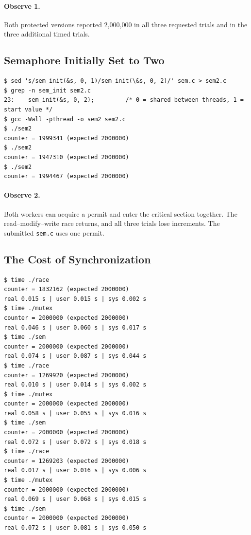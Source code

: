 \documentclass[12pt,a4paper]{article}
\begin{document}
\paragraph{Observe 1.} Both protected versions reported 2,000,000 in all three
requested trials and in the three additional timed trials.

\subsection{Semaphore Initially Set to Two}

\begin{lstlisting}[caption={Two permits admit both workers}]
$ sed 's/sem_init(&s, 0, 1)/sem_init(\&s, 0, 2)/' sem.c > sem2.c
$ grep -n sem_init sem2.c
23:    sem_init(&s, 0, 2);         /* 0 = shared between threads, 1 = start value */
$ gcc -Wall -pthread -o sem2 sem2.c
$ ./sem2
counter = 1999341 (expected 2000000)
$ ./sem2
counter = 1947310 (expected 2000000)
$ ./sem2
counter = 1994467 (expected 2000000)
\end{lstlisting}

\paragraph{Observe 2.} Both workers can acquire a permit and enter the critical
section together. The read--modify--write race returns, and all three trials lose
increments. The submitted \texttt{sem.c} uses one permit.

\subsection{The Cost of Synchronization}

\begin{lstlisting}[caption={Three wall-time measurements per version}]
$ time ./race
counter = 1832162 (expected 2000000)
real 0.015 s | user 0.015 s | sys 0.002 s
$ time ./mutex
counter = 2000000 (expected 2000000)
real 0.046 s | user 0.060 s | sys 0.017 s
$ time ./sem
counter = 2000000 (expected 2000000)
real 0.074 s | user 0.087 s | sys 0.044 s
$ time ./race
counter = 1269920 (expected 2000000)
real 0.010 s | user 0.014 s | sys 0.002 s
$ time ./mutex
counter = 2000000 (expected 2000000)
real 0.058 s | user 0.055 s | sys 0.016 s
$ time ./sem
counter = 2000000 (expected 2000000)
real 0.072 s | user 0.072 s | sys 0.018 s
$ time ./race
counter = 1269203 (expected 2000000)
real 0.017 s | user 0.016 s | sys 0.006 s
$ time ./mutex
counter = 2000000 (expected 2000000)
real 0.069 s | user 0.068 s | sys 0.015 s
$ time ./sem
counter = 2000000 (expected 2000000)
real 0.072 s | user 0.081 s | sys 0.050 s
\end{lstlisting}
\end{document}
